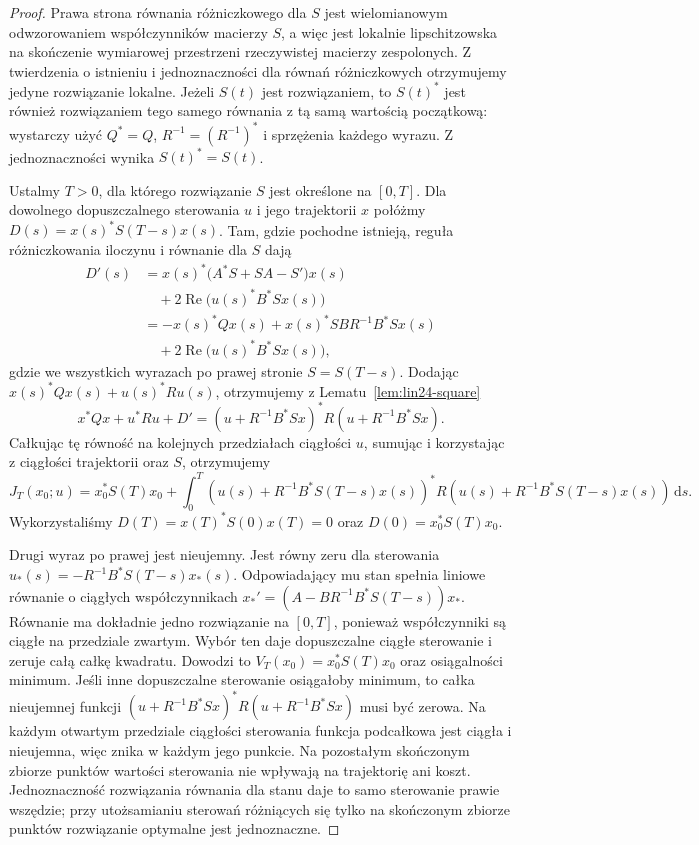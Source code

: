 \begin{proof}
Prawa strona równania
różniczkowego dla \(S\)
jest wielomianowym
odwzorowaniem współczynników
macierzy \(S\), a więc jest
lokalnie lipschitzowska
na skończenie wymiarowej
przestrzeni rzeczywistej
macierzy zespolonych.
Z twierdzenia o istnieniu
i jednoznaczności dla
równań różniczkowych
otrzymujemy jedyne
rozwiązanie lokalne.
Jeżeli \(S(t)\)
jest rozwiązaniem,
to \(S(t)^*\) jest również
rozwiązaniem tego samego
równania z tą samą
wartością początkową:
wystarczy użyć \(Q^*=Q\),
\(R^{-1}=(R^{-1})^*\)
i sprzężenia każdego wyrazu.
Z jednoznaczności wynika
\(S(t)^*=S(t)\).

Ustalmy \(T>0\),
dla którego rozwiązanie \(S\)
jest określone na \([0,T]\).
Dla dowolnego dopuszczalnego
sterowania \(u\) i
jego trajektorii \(x\)
połóżmy
\(D(s)=x(s)^*S(T-s)x(s)\).
Tam, gdzie pochodne istnieją,
reguła różniczkowania iloczynu
i równanie dla \(S\) dają
\[
 \begin{aligned}
 D'(s)
 &=x(s)^*\bigl(A^*S+SA-S'\bigr)x(s)\\
 &\quad+2\operatorname{Re}
          \bigl(u(s)^*B^*Sx(s)\bigr)\\
 &=-x(s)^*Qx(s)
    +x(s)^*SBR^{-1}B^*Sx(s)\\
 &\quad+2\operatorname{Re}
          \bigl(u(s)^*B^*Sx(s)\bigr),
 \end{aligned}
\]
gdzie we wszystkich wyrazach
po prawej stronie
\(S=S(T-s)\).
Dodając
\(x(s)^*Qx(s)+u(s)^*Ru(s)\),
otrzymujemy z
Lematu~\ref{lem:lin24-square}
\[
 x^*Qx+u^*Ru+D'
 =(u+R^{-1}B^*Sx)^*
   R(u+R^{-1}B^*Sx).
\]
Całkując tę równość
na kolejnych przedziałach
ciągłości \(u\), sumując
i korzystając z ciągłości
trajektorii oraz \(S\),
otrzymujemy
\[
 J_T(x_0;u)=x_0^*S(T)x_0+
 \int_0^T
  (u(s)+R^{-1}B^*S(T-s)x(s))^*
  R(u(s)+R^{-1}B^*S(T-s)x(s))
  \,\mathrm ds.
\]
Wykorzystaliśmy
\(D(T)=x(T)^*S(0)x(T)=0\)
oraz \(D(0)=x_0^*S(T)x_0\).

Drugi wyraz po prawej
jest nieujemny.
Jest równy zeru
dla sterowania
\(u_*(s)=-R^{-1}B^*S(T-s)x_*(s)\).
Odpowiadający mu stan
spełnia liniowe równanie
o ciągłych współczynnikach
\(x_*'=(A-BR^{-1}B^*S(T-s))x_*\).
Równanie ma dokładnie jedno
rozwiązanie na \([0,T]\),
ponieważ współczynniki
są ciągłe na przedziale
zwartym. Wybór ten daje
dopuszczalne ciągłe sterowanie
i zeruje całą całkę kwadratu.
Dowodzi to
\(V_T(x_0)=x_0^*S(T)x_0\)
oraz osiągalności minimum.
Jeśli inne dopuszczalne
sterowanie osiągałoby minimum,
to całka nieujemnej funkcji
\((u+R^{-1}B^*Sx)^*R
(u+R^{-1}B^*Sx)\)
musi być zerowa.
Na każdym otwartym przedziale
ciągłości sterowania
funkcja podcałkowa jest ciągła
i nieujemna, więc znika
w każdym jego punkcie.
Na pozostałym skończonym zbiorze
punktów wartości sterowania
nie wpływają na trajektorię
ani koszt. Jednoznaczność
rozwiązania równania dla
stanu daje to samo sterowanie
prawie wszędzie; przy
utożsamianiu sterowań
różniących się tylko
na skończonym zbiorze
punktów rozwiązanie
optymalne jest jednoznaczne.


\end{proof}
